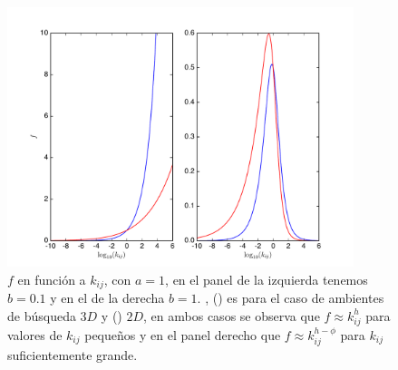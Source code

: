 \begin{figure}
\begin{center}
 \includegraphics[width=0.9\textwidth]{./Plots/f1Grazing.pdf}
 \caption[$f_1, Grazing$]{$f$ en funci\'on a $k_{ij}$, con $a =1$, en el panel de la izquierda tenemos $b = 0.1$ y en el de la derecha $b=1.$ , ({\hwplotB}) es para el caso de ambientes de b\'usqueda $3D$ y ({\hwplotR}) $2D$, en ambos casos se observa que $f \approx k_{ij}^{h}$ para valores de $k_{ij}$ peque\~nos y en el panel derecho que $f \approx k_{ij}^{h - \phi}$ para $k_{ij}$ suficientemente grande.}
 \label{fig:f1Grazing} 
\end{center}
\end{figure}


